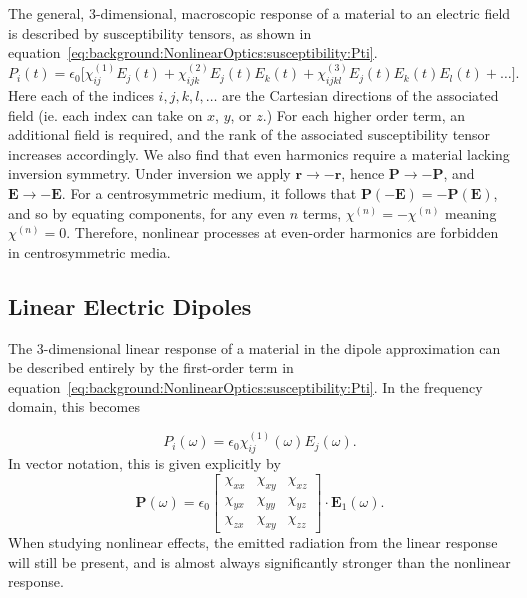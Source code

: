 The general, 3-dimensional, macroscopic response of a material to an electric field is described by susceptibility tensors, as shown in equation~\ref{eq:background:NonlinearOptics:susceptibility:Pti}.
\begin{equation}\label{eq:background:NonlinearOptics:susceptibility:Pti}
	P_{i}(t) =  \epsilon_{0}\big[
				\chi^{(1)}_{ij}  E_{j}(t) +
				\chi^{(2)}_{ijk}  E_{j}(t) E_{k}(t) +
				\chi^{(3)}_{ijkl}  E_{j}(t) E_{k}(t) E_{l}(t)+ \ldots
				\big].
\end{equation}
Here each of the indices $i,j,k,l,\ldots$ are the Cartesian directions of the associated field (ie. each index can take on $x$, $y$, or $z$.) For each higher order term, an additional field is required, and the rank of the associated susceptibility tensor increases accordingly. 
We also find that even harmonics require a material lacking inversion symmetry. Under inversion we apply $\mathbf{r}\rightarrow -\mathbf{r}$, hence $\mathbf{P} \rightarrow -\mathbf{P}$, and $\mathbf{E} \rightarrow -\mathbf{E}$. For a centrosymmetric medium, it follows that $\mathbf{P}(-\mathbf{E}) = -\mathbf{P}(\mathbf{E})$, and so by equating components, for any even $n$ terms, $\chi^{(n)}=-\chi^{(n)}$ meaning $\chi^{(n)} = 0$. Therefore, nonlinear processes at even-order harmonics are forbidden in centrosymmetric media.

\subsection{Linear Electric Dipoles}\label{sec:background:NonlinearOptics:linearP}
The 3-dimensional linear response of a material in the dipole approximation can be described entirely by the first-order term in equation~\ref{eq:background:NonlinearOptics:susceptibility:Pti}. In the frequency domain, this becomes

\begin{equation}
	P_{i}(\omega) =  \epsilon_{0}
				\chi^{(1)}_{ij}(\omega)  E_{j}(\omega).
\end{equation}
In vector notation, this is given explicitly by
\begin{equation}
	\mathbf{P}(\omega) =  \epsilon_{0}
				\begin{bmatrix}
		\chi_{xx} & \chi_{xy} & \chi_{xz}\\ 
		\chi_{yx} & \chi_{yy} & \chi_{yz}\\ 
		\chi_{zx} & \chi_{xy} & \chi_{zz}
	\end{bmatrix} \cdot \mathbf{E}_{1}(\omega).
\end{equation}
When studying nonlinear effects, the emitted radiation from the linear response will still be present, and is almost always significantly stronger than the nonlinear response.


